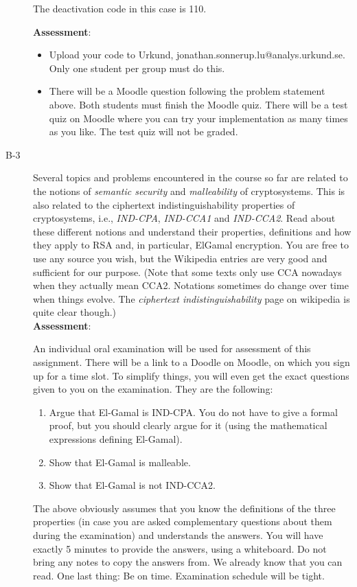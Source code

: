 \documentclass{article}
\begin{document}
\begin{description}
{			The deactivation code in this case is 110.
			
			\textbf{Assessment}:
			\begin{itemize}
				\item Upload your code to Urkund, jonathan.sonnerup.lu@analys.urkund.se. Only one student per group must do this.
				\item There will be a Moodle question following the problem statement above. Both students must finish the Moodle quiz. There will be	a test quiz on Moodle where you can try your implementation as many times as you like. The test quiz will not be graded.
			\end{itemize}}
			
			\item[B-3]{Several topics and problems encountered in the course so far are related to the notions of \textit{semantic security} and \textit{malleability} of cryptosystems. This is also related to the ciphertext indistinguishability properties of cryptosystems, i.e., \textit{IND-CPA}, \textit{IND-CCA1} and \textit{IND-CCA2}. Read about these different notions and understand their properties, definitions and how they apply to RSA and, in particular, ElGamal encryption. You are free to use any source you wish, but the Wikipedia entries are very good and sufficient for our purpose. (Note that some texts only use CCA nowadays when they actually mean CCA2. Notations sometimes do change over time when things evolve. The \textit{ciphertext indistinguishability} page on wikipedia is quite clear though.)\\
				\textbf{Assessment}:

			An individual oral examination will be used for assessment of this assignment. There will be a link to a Doodle on Moodle, on which you sign up for a time slot. To simplify things, you will even get the exact questions given to you on the examination. They are the following:
			\begin{enumerate}
				\item Argue that El-Gamal is IND-CPA. You do not have to give a formal proof, but you should clearly argue for it (using the mathematical expressions defining El-Gamal).
				\item Show that El-Gamal is malleable.
				\item Show that El-Gamal is not IND-CCA2.
			\end{enumerate}
			The above obviously assumes that you know the definitions of the three properties (in case you are asked complementary questions about them during the examination) and understands the answers. You will have exactly 5 minutes to provide the answers, using a whiteboard. Do not bring any notes to copy the answers from. We already know that you can read. One last thing: Be on time. Examination schedule will be tight.}
			\end{description}
		
\end{document}
